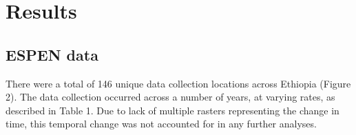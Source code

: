 \documentclass[
]{article}
\begin{document}
\hypertarget{results}{%
\section{Results}\label{results}}

\hypertarget{espen-data}{%
\subsection{ESPEN data}\label{espen-data}}

There were a total of 146 unique data collection locations across
Ethiopia (Figure 2). The data collection occurred across a number of
years, at varying rates, as described in Table 1. Due to lack of
multiple rasters representing the change in time, this temporal change
was not accounted for in any further analyses.
\end{document}
